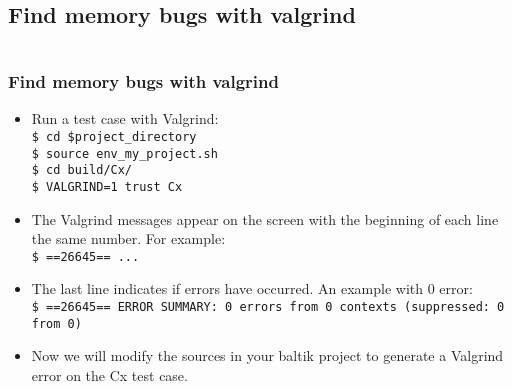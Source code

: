 \documentclass[10pt, hyperref={unicode=true,pdfusetitle, bookmarks=true,bookmarksnumbered=false,bookmarksopen=false, breaklinks=false,pdfborder={0 0 1},backref=true,colorlinks=true,linkcolor=darkblue,pageanchor, urlcolor=darkblue}]{beamer}
\begin{document}
\subsection{{\bf{Find memory bugs with valgrind}}}
\begin{frame}
\begin{columns}[c] 
\tableofcontents[sections={1-4},currentsection, currentsubsection]
\tableofcontents[sections={5-10},currentsection, currentsubsection]
\end{columns}
\end{frame}
\begin{frame}
\frametitle{Find memory bugs with valgrind}
\begin{block}{}

\begin{itemize}
\item Run a test case with Valgrind:\\
\texttt{\$ cd \$project\_directory}\\
\texttt{\$ source env\_my\_project.sh}\\
\texttt{\$ cd build/Cx/}\\
\texttt{\$ VALGRIND=1 trust Cx}\\
\item The Valgrind messages appear on the screen with the beginning of each line the same number. For example:\\
\texttt{\$ ==26645== ...}\\
\item The last line indicates if errors have occurred. An example with 0 error:\\
\texttt{\$ ==26645== ERROR SUMMARY: 0 errors from 0 contexts (suppressed: 0 from 0)}
\end{itemize}
\begin{itemize}
\item Now we will modify the sources in your baltik project to generate a Valgrind error on the Cx test case.\\
\end{itemize}

\end{block}
\end{frame}
\end{document}
